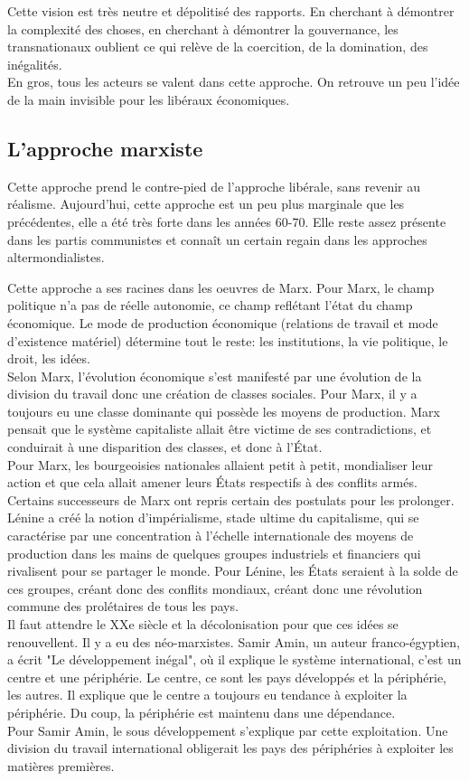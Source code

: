\documentclass[10pt, a4paper, openany]{book}
\begin{document}
Cette vision est très neutre et dépolitisé des rapports. En cherchant à démontrer la complexité des choses, en cherchant à démontrer la gouvernance, les transnationaux oublient ce qui relève de la coercition, de la domination, des inégalités. \\
En gros, tous les acteurs se valent dans cette approche. On retrouve un peu l'idée de la main invisible pour les libéraux économiques. 

\subsection{L'approche marxiste}

Cette approche prend le contre-pied de l'approche libérale, sans revenir au réalisme. Aujourd'hui, cette approche est un peu plus marginale que les précédentes, elle a été très forte dans les années 60-70. Elle reste assez présente dans les partis communistes et connaît un certain regain dans les approches altermondialistes.


Cette approche a ses racines dans les oeuvres de Marx. Pour Marx, le champ politique n'a pas de réelle autonomie, ce champ reflétant l'état du champ économique. Le mode de production économique (relations de travail et mode d'existence matériel) détermine tout le reste: les institutions, la vie politique, le droit, les idées. \\
Selon Marx, l'évolution économique s'est manifesté par une évolution de la division du travail donc une création de classes sociales. Pour Marx, il y a toujours eu une classe dominante qui possède les moyens de production. Marx pensait que le système capitaliste allait être victime de ses contradictions, et conduirait à une disparition des classes, et donc à l'État. \\
Pour Marx, les bourgeoisies nationales allaient petit à petit, mondialiser leur action et que cela allait amener leurs États respectifs à des conflits armés. \\
Certains successeurs de Marx ont repris certain des postulats pour les prolonger. Lénine a créé la notion d'impérialisme, stade ultime du capitalisme, qui se caractérise par une concentration à l'échelle internationale des moyens de production dans les mains de quelques groupes industriels et financiers qui rivalisent pour se partager le monde. Pour Lénine, les États seraient à la solde de ces groupes, créant donc des conflits mondiaux, créant donc une révolution commune des prolétaires de tous les pays. \\
Il faut attendre le XXe siècle et la décolonisation pour que ces idées se renouvellent. Il y a eu des néo-marxistes. Samir Amin, un auteur franco-égyptien, a écrit "Le développement inégal", où il explique le système international, c'est un centre et une périphérie. Le centre, ce sont les pays développés et la périphérie, les autres. Il explique que le centre a toujours eu tendance à exploiter la périphérie. Du coup, la périphérie est maintenu dans une dépendance. \\
Pour Samir Amin, le sous développement s'explique par cette exploitation. Une division du travail international obligerait les pays des périphéries à exploiter les matières premières.
\end{document}
